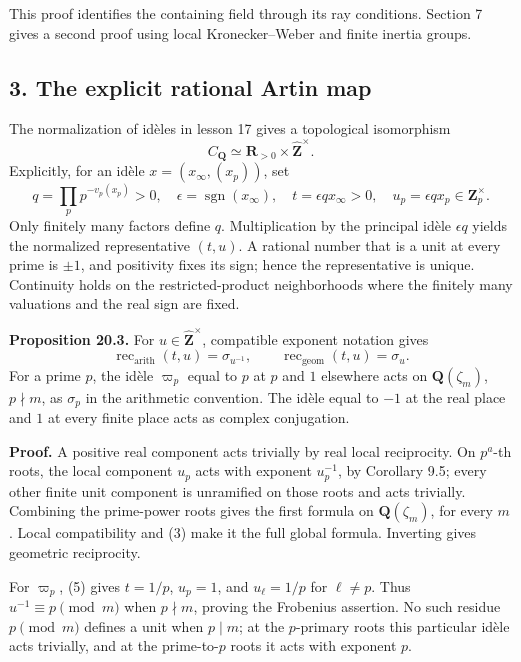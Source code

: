 \documentclass[11pt,a4paper]{article}
\begin{document}
This proof identifies the containing field through its ray conditions.
Section 7 gives a second proof using local Kronecker--Weber and finite
inertia groups.

\subsection{3. The explicit rational Artin
map}\label{the-explicit-rational-artin-map}

The normalization of idèles in lesson 17 gives a topological isomorphism
\[
C_{\mathbf Q}\simeq\mathbf R_{>0}\times\widehat{\mathbf Z}^{\times}.
\tag{4}
\] Explicitly, for an idèle \(x=(x_\infty,(x_p))\), set \[
q=\prod_p p^{-v_p(x_p)}>0,\quad
\epsilon=\operatorname{sgn}(x_\infty),\quad
t=\epsilon qx_\infty>0,\quad u_p=\epsilon qx_p\in\mathbf Z_p^\times.
\tag{5}
\] Only finitely many factors define \(q\). Multiplication by the
principal idèle \(\epsilon q\) yields the normalized representative
\((t,u)\). A rational number that is a unit at every prime is \(\pm1\),
and positivity fixes its sign; hence the representative is unique.
Continuity holds on the restricted-product neighborhoods where the
finitely many valuations and the real sign are fixed.

\textbf{Proposition 20.3.} For \(u\in\widehat{\mathbf Z}^{\times}\),
compatible exponent notation gives \[
\operatorname{rec}_{\mathrm{arith}}(t,u)=\sigma_{u^{-1}},
\qquad
\operatorname{rec}_{\mathrm{geom}}(t,u)=\sigma_u.
\tag{6}
\] For a prime \(p\), the idèle \(\varpi_p\) equal to \(p\) at \(p\) and
\(1\) elsewhere acts on \(\mathbf Q(\zeta_m)\), \(p\nmid m\), as
\(\sigma_p\) in the arithmetic convention. The idèle equal to \(-1\) at
the real place and \(1\) at every finite place acts as complex
conjugation.

\textbf{Proof.} A positive real component acts trivially by real local
reciprocity. On \(p^a\)-th roots, the local component \(u_p\) acts with
exponent \(u_p^{-1}\), by Corollary 9.5; every other finite unit
component is unramified on those roots and acts trivially. Combining the
prime-power roots gives the first formula on \(\mathbf Q(\zeta_m)\), for
every \(m\). Local compatibility and (3) make it the full global
formula. Inverting gives geometric reciprocity.

For \(\varpi_p\), (5) gives \(t=1/p\), \(u_p=1\), and \(u_\ell=1/p\) for
\(\ell\ne p\). Thus \(u^{-1}\equiv p\pmod m\) when \(p\nmid m\), proving
the Frobenius assertion. No such residue \(p\pmod m\) defines a unit
when \(p\mid m\); at the \(p\)-primary roots this particular idèle acts
trivially, and at the prime-to-\(p\) roots it acts with exponent \(p\).
\end{document}

